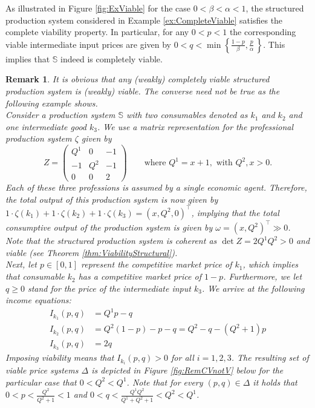 \documentclass[11pt,fleqn]{article}
\newtheorem{remark}[theorem]{Remark}
\begin{document}
\noindent
As illustrated in Figure \ref{fig:ExViable} for the case $0< \beta < \alpha <1$, the structured production system considered in Example \ref{ex:CompleteViable} satisfies the complete viability property. In particular, for any $0<p<1$ the corresponding viable intermediate input prices are given by $0 < q < \min \left\{ \tfrac{1-p}{\beta} , \tfrac{p}{\alpha} \, \right\}$. This implies that $\mathbb S$ indeed is completely viable.

\begin{remark}\label{remark: CV implies V}
	It is obvious that any (weakly) completely viable structured production system is (weakly) viable. The converse need not be true as the following example shows. \\
	Consider a production system $\mathbb S$ with two consumables denoted as $k_1$ and $k_2$ and one intermediate good $k_3$. We use a matrix representation for the professional production system $\zeta$ given by
	\[
	Z =
	\begin{pmatrix}
	Q^1 & 0 & -1 \\
	-1 & Q^2 & -1 \\
	0 & 0 & 2
	\end{pmatrix}
	\qquad \mbox{where } Q^1=x+1,\,\,\mbox{with}\,\,Q^2,x>0 .
	\]
	Each of these three professions is assumed by a single economic agent. Therefore, the total output of this production system is now given by $1 \cdot \zeta (k_1) + 1 \cdot \zeta (k_2) + 1 \cdot \zeta (k_3) = (x,Q^2,0)^\top$, implying that the total consumptive output of the production system is given by $\omega = (x,Q^2)^\top \gg 0$. \\
	Note that  the structured production system is coherent as $\det Z = 2Q^1Q^2 >0$ and viable (see Theorem \ref{thm:ViabilityStructural}).  \\[1ex]
	Next, let $p \in [0,1]$ represent the competitive market price of $k_1$, which implies that consumable $k_2$ has a competitive market price of $1-p$. Furthermore, we let $q \geqslant 0$ stand for the price of the intermediate input $k_3$. We arrive at the following income equations:
	\begin{align*}
	I_{k_1} (p,q) & = Q^1p -q \\
	I_{k_2} (p,q) & = Q^2 (1-p) -p -q = Q^2-q - (Q^2+1)p\\
	I_{k_3} (p,q) & = 2q 
	\end{align*}
	Imposing viability means that $I_{k_i} (p,q)>0$ for all $i=1,2,3$. The resulting set of viable price systems $\Delta$ is depicted in Figure \ref{fig:RemCVnotV} below for the particular case that $0 < Q^2 < Q^1$. Note that for every $(p,q) \in \Delta$ it holds that $0 < p < \tfrac{Q^2}{Q^2+1}<1$ and $0 < q < \tfrac{Q^1Q^2}{Q^1+Q^2+1} <Q^2 < Q^1$.
	

\end{remark}
\end{document}
